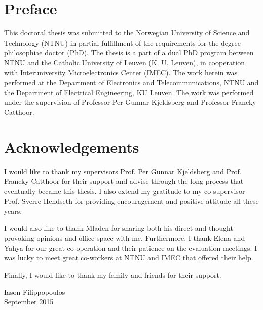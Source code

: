 \section*{\Huge Preface }
\bigskip
\bigskip
This doctoral thesis was submitted to the Norwegian University of Science and Technology (NTNU) in partial fulfillment of the requirements for the degree philosophiae doctor (PhD). 
The thesis is a part of a dual PhD program between NTNU and the Catholic University of Leuven (K. U. Leuven), in cooperation with Interuniversity Microelectronics Center (IMEC).
The work herein was performed at the Department of Electronics and Telecommunications, NTNU and the Department of Electrical Engineering, KU Leuven.
The work was performed under the supervision of Professor Per Gunnar Kjeldsberg and Professor Francky Catthoor.

\bigskip
\bigskip

\section*{Acknowledgements}

\bigskip

I would like to thank my supervisors Prof. Per Gunnar Kjeldsberg and Prof. Francky Catthoor for their support and advise through the long process that eventually became this thesis. 
I also extend my gratitude to my co-supervisor Prof. Sverre Hendseth for providing encouragement and positive attitude all these years.

I would also like to thank Mladen for sharing both his direct and thought-provoking opinions and office space with me.
Furthermore, I thank Elena and Yahya for our great co-operation and their patience on the evaluation meetings.
I was lucky to meet great co-workers at NTNU and IMEC that offered their help. 

Finally, I would like to thank my family and friends for their support. 

\bigskip

\begin{flushright}
Iason Filippopoulos \\
September 2015
\end{flushright}

\vspace*{\fill}
